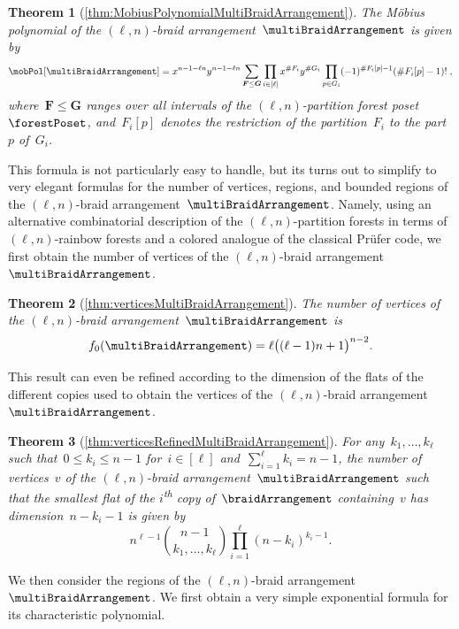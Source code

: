 \documentclass{amsart}
\newtheorem*{theorem*}{Theorem}
\theoremstyle{definition}
\renewcommand{\b}[1]{{\boldsymbol{#1}}} %
\newcommand{\ordinal}{\textsuperscript{th}} %
\renewcommand{\b}[1]{\boldsymbol{#1}} %
\begin{document}
\begin{theorem*}[\cref{thm:MobiusPolynomialMultiBraidArrangement}]
The M\"obius polynomial of the $(\ell,n)$-braid arrangement~$\multiBraidArrangement$ is given by
\[
\mobPol[\multiBraidArrangement] = x^{n-1-\ell n} y^{n-1-\ell n} \sum_{\b{F} \le \b{G}} \prod_{i \in [\ell]} x^{\#F_i} y^{\#G_i} \prod_{p \in G_i} (-1)^{\#F_i[p]-1} (\# F_i[p]-1)! \; ,
\]
where~$\b{F} \le \b{G}$ ranges over all intervals of the $(\ell,n)$-partition forest poset~$\forestPoset$, and~$F_i[p]$ denotes the restriction of the partition~$F_i$ to the part~$p$ of~$G_i$.
\end{theorem*}

This formula is not particularly easy to handle, but its turns out to simplify to very elegant formulas for the number of vertices, regions, and bounded regions of the $(\ell,n)$-braid arrangement~$\multiBraidArrangement$.
Namely, using an alternative combinatorial description of the $(\ell,n)$-partition forests in terms of $(\ell, n)$-rainbow forests and a colored analogue of the classical Pr\"ufer code, we first obtain the number of vertices of the $(\ell,n)$-braid arrangement~$\multiBraidArrangement$.

\begin{theorem*}[\cref{thm:verticesMultiBraidArrangement}]
The number of vertices of the $(\ell,n)$-braid arrangement~$\multiBraidArrangement$ is
\[
f_0(\multiBraidArrangement) = \ell \big( (\ell-1) n + 1 \big)^{n-2}.
\]
\end{theorem*}

This result can even be refined according to the dimension of the flats of the different copies used to obtain the vertices of the $(\ell,n)$-braid arrangement~$\multiBraidArrangement$.

\begin{theorem*}[\cref{thm:verticesRefinedMultiBraidArrangement}]
For any~$k_1, \dots, k_\ell$ such that~$0 \le k_i \le n-1$ for~$i \in [\ell]$ and~${\sum_{i=1}^\ell k_i = n-1}$, the number of vertices~$v$ of the $(\ell,n)$-braid arrangement~$\multiBraidArrangement$ such that the smallest flat of the $i$\ordinal{} copy of~$\braidArrangement$ containing~$v$ has dimension~$n-k_i-1$ is given by
\[
n^{\ell-1} \binom{n-1}{k_1, \dots, k_\ell} \prod_{i=1}^\ell (n-k_i)^{k_i-1}.
\]
\end{theorem*}

We then consider the regions of the $(\ell,n)$-braid arrangement~$\multiBraidArrangement$.
We first obtain a very simple exponential formula for its characteristic polynomial.
\end{document}
